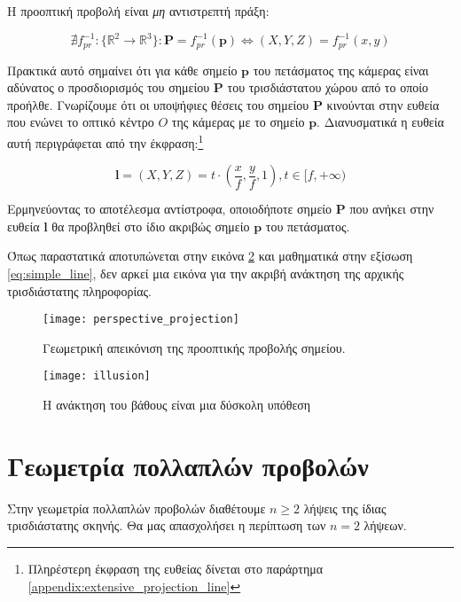 Η προοπτική προβολή είναι \emph{μη} αντιστρεπτή πράξη: 

$$ \nexists f_{pr}^{-1} : \lbrace\mathbb{R}^2 \rightarrow \mathbb{R}^3\rbrace : \mathbf{P} = f_{pr}^{-1}(\mathbf{p}) \Leftrightarrow (X,Y,Z) = f_{pr}^{-1}(x,y) $$

Πρακτικά αυτό σημαίνει ότι για κάθε σημείο $\mathbf{p}$ του πετάσματος της κάμερας είναι αδύνατος ο προσδιορισμός του σημείου $\mathbf{P}$ του τρισδιάστατου χώρου από το οποίο προήλθε. Γνωρίζουμε ότι οι υποψήφιες θέσεις του σημείου $\mathbf{P}$ κινούνται στην ευθεία που ενώνει το οπτικό κέντρο $O$ της κάμερας με το σημείο $\mathbf{p}$. Διανυσματικά η ευθεία αυτή περιγράφεται από την έκφραση:\footnote{Πληρέστερη έκφραση της ευθείας δίνεται στο παράρτημα \ref{appendix:extensive_projection_line}}

\begin{equation} \label{eq:simple_line}
\mathbf{l} = (X,Y,Z) = t\cdot \left (\dfrac{x}{f}, \dfrac{y}{f}, 1\right),  t \in [f,+\infty)
\end{equation}

Ερμηνεύοντας το αποτέλεσμα αντίστροφα, οποιοδήποτε σημείο $\mathbf{P}$ που ανήκει στην ευθεία $\mathbf{l}$ θα προβληθεί στο ίδιο ακριβώς σημείο $ \mathbf{p} $ του πετάσματος. 

Όπως παραστατικά αποτυπώνεται στην εικόνα \ref{fig:illusion} και μαθηματικά στην εξίσωση \ref{eq:simple_line}, δεν αρκεί μια εικόνα για την ακριβή ανάκτηση της αρχικής τρισδιάστατης πληροφορίας.


\begin{figure}
	\centering
	\texttt{[image: perspective\_projection]}
	\caption{Γεωμετρική απεικόνιση της προοπτικής προβολής σημείου.}
	\label{fig:persp_proj}
\end{figure}

\begin{figure}
	\centering
	\texttt{[image: illusion]}
	\caption{Η ανάκτηση του βάθους είναι μια δύσκολη υπόθεση}
	\label{fig:illusion}
\end{figure}


\section{Γεωμετρία πολλαπλών προβολών}

Στην γεωμετρία πολλαπλών προβολών διαθέτουμε $n\geq2$ λήψεις της ίδιας τρισδιάστατης σκηνής. Θα μας απασχολήσει η περίπτωση των $n=2$ λήψεων.

